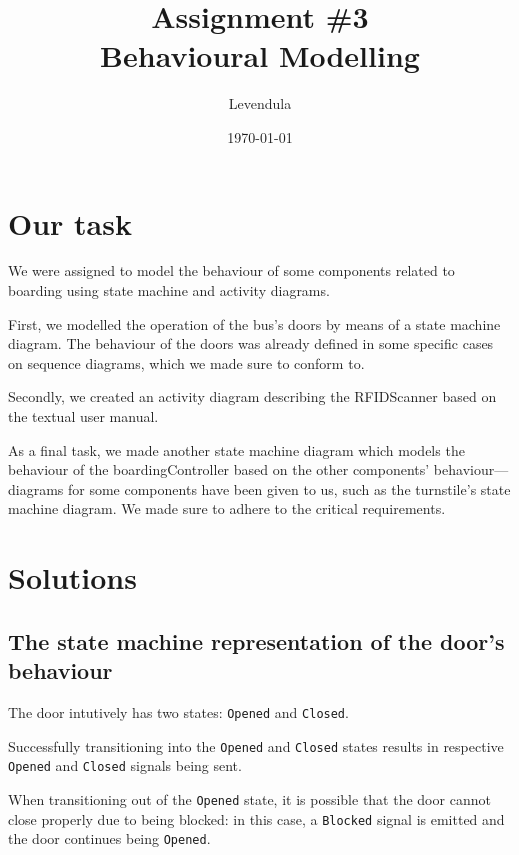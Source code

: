 \documentclass[a4paper]{article}
\title{Assignment \#3 \\ Behavioural Modelling}
\author{Levendula}
\date{\today}
\begin{document}


\tableofcontents
\listoffigures
\clearpage



\section{Our task}

We were assigned to model the behaviour of some components related to boarding
using state machine and activity diagrams.

First, we modelled the operation of the bus's doors by means of a state machine
diagram. The behaviour of the doors was already defined in some specific cases
on sequence diagrams, which we made sure to conform to.

Secondly, we created an activity diagram describing the \gls{RFIDScanner} based
on the textual user manual.

As a final task, we made another state machine diagram which models the
behaviour of the \gls{boardingController} based on the other components'
behaviour—diagrams for some components have been given to us, such as the
\gls{turnstile}'s state machine diagram. We made sure to adhere to the critical
requirements.


\section{Solutions}


\subsection{The state machine representation of the door's behaviour}

The door intutively has two states: \texttt{Opened} and \texttt{Closed}.

Successfully transitioning into the \texttt{Opened} and \texttt{Closed} states
results in respective \texttt{Opened} and \texttt{Closed} signals being sent.

When transitioning out of the \texttt{Opened} state, it is possible that the
door cannot close properly due to being blocked: in this case, a
\texttt{Blocked} signal is emitted and the door continues being \texttt{Opened}.
\end{document}
